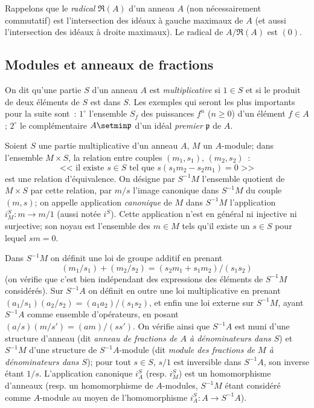 \begin{env}[1.1.2]
\label{0.1.1.2-fr}
Rappelons que le \emph{radical} $\mathfrak{R}(A)$ d'un anneau $A$ (non nécessairement commutatif) est l'intersection des idéaux à gauche maximaux de $A$ (et aussi l'intersection des idéaux à droite maximaux).
Le radical de $A/\mathfrak{R}(A)$ est $(0)$.
\end{env}

\subsection{Modules et anneaux de fractions}
\label{subsection:0.1.2-fr}

\begin{env}[1.2.1]
\label{0.1.2.1-fr}
On dit qu'une partie $S$ d'un anneau $A$ est \emph{multiplicative} si $1\in S$ et si le produit de deux éléments de $S$ est dans $S$.
Les exemples qui seront les plus importants pour la suite sont~: $1^\circ$ l'ensemble $S_f$ des puissances $f^n$ ($n\geq 0$) d'un élément $f\in A$; $2^\circ$ le complémentaire $A\setmin\mathfrak{p}$ d'un idéal \emph{premier} $\mathfrak{p}$ de $A$.
\end{env}

\begin{env}[1.2.2]
\label{0.1.2.2-fr}
Soient $S$ une partie multiplicative d'un anneau $A$, $M$ un $A$-module; dans l'ensemble $M\times S$, la relation entre couples $(m_1,s_1)$, $(m_2,s_2)$~:
\[
  \text{<<~il existe $s\in S$ tel que $s(s_1m_2-s_2m_1)=0$~>>}
\]
est une relation d'équivalence.
On désigne par $S^{-1}M$ l'ensemble quotient de $M\times S$ par cette relation, par $m/s$ l'image canonique dans $S^{-1}M$ du couple $(m,s)$; on appelle application \emph{canonique} de $M$ dans $S^{-1}M$ l'application $i_M^S:m\to m/1$ (aussi notée $i^S$).
Cette application n'est en général ni injective ni surjective; son noyau est l'ensemble des $m\in M$ tels qu'il existe un $s\in S$ pour lequel $sm=0$.

Dans $S^{-1}M$ on définit une loi de groupe additif en prenant
\[
  (m_1/s_1)+(m_2/s_2)=(s_2m_1+s_1m_2)/(s_1s_2)
\]
(on vérifie que c'est bien indépendant des expressions des éléments de $S^{-1}M$ considérés).
Sur $S^{-1}A$ on définit en outre une loi multiplicative en prenant $(a_1/s_1)(a_2/s_2)=(a_1a_2)/(s_1s_2)$, et enfin une loi externe sur $S^{-1}M$, ayant $S^{-1}A$ comme ensemble d'opérateurs, en posant $(a/s)(m/s')=(am)/(ss')$.
On vérifie ainsi que $S^{-1}A$ est muni d'une structure d'anneau (dit \emph{anneau de fractions de $A$ à dénominateurs dans $S$}) et $S^{-1}M$ d'une structure de $S^{-1}A$-module (dit \emph{module des fractions de $M$ à dénominateurs dans $S$}); pour tout $s\in S$, $s/1$ est inversible dans $S^{-1}A$, son inverse étant $1/s$.
L'application canonique $i_A^S$ (resp. $i_M^S$) est un homomorphisme d'anneaux (resp. un homomorphisme de $A$-modules, $S^{-1}M$ étant considéré comme $A$-module au moyen de l'homomorphisme $i_A^S:A\to S^{-1}A$).
\end{env}


